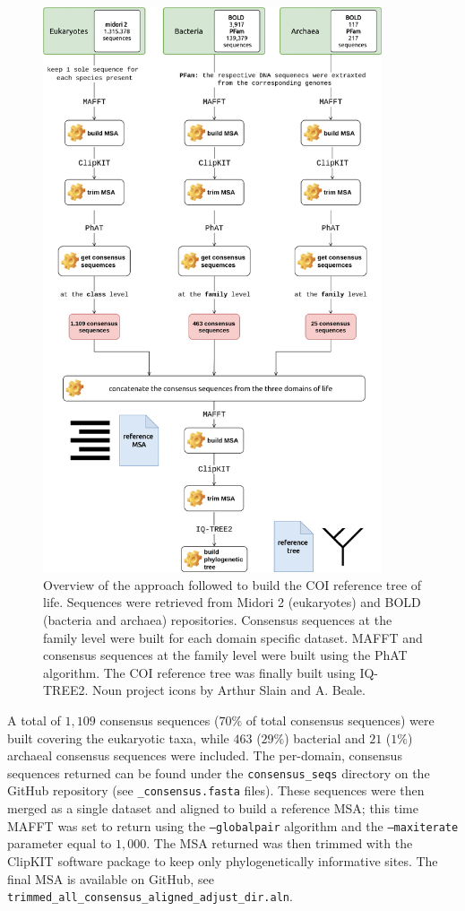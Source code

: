    \begin{figure}
      \centering
      \includegraphics[width=100mm]{figures/darn_methodology.jpg}
      \caption[Building the COI reference tree of life]{
         Overview of the approach followed to build the COI reference tree of life. 
         Sequences were retrieved from Midori 2 (eukaryotes) and BOLD (bacteria and archaea) repositories. 
         Consensus sequences at the family level were built for each domain specific dataset. 
         MAFFT and consensus sequences at the family level were built using the PhAT algorithm. 
         The COI reference tree was finally built using IQ-TREE2. 
         Noun project icons by Arthur Slain and A. Beale.
      }
      \label{fig:darn-build-tree}
   \end{figure}


   A total of $1,109$ consensus sequences ($70\%$ of total consensus sequences) were built covering the eukaryotic taxa, 
   while $463$ ($29\%$) bacterial and $21$ ($1\%$) archaeal consensus sequences were included. 
   The per-domain, consensus sequences returned can be found under the \texttt{consensus\_seqs} directory on 
   the GitHub repository 
   (see \texttt{\_consensus.fasta} files). 
   These sequences were then merged as a single dataset and aligned to build a reference MSA; 
   this time MAFFT was set to return using the \texttt{--globalpair} algorithm and the \texttt{--maxiterate} parameter 
   equal to $1,000$. 
   The MSA returned was then trimmed with the ClipKIT software package \cite{steenwyk2020clipkit} to keep only phylogenetically informative sites. 
   The final MSA is available on GitHub, see \texttt{trimmed\_all\_consensus\_aligned\_adjust\_dir.aln}.


